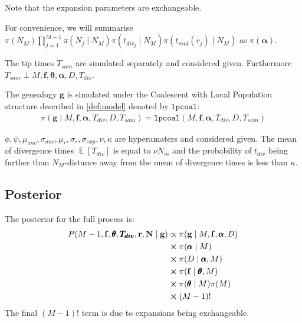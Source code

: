 \documentclass{report}
\theoremstyle{definition}
\begin{document}
Note that the expansion parameters are exchangeable.

For convenience, we will summarise $\pi(N_M)\prod\limits_{j=1}^{M-1}\pi(N_j\mid N_{M})\pi(t_{div_j}\mid N_{M})\pi(t_{mid}(r_j)\mid N_M)$ as $\pi(\pmb\alpha)$.

The tip times $T_{sam}$ are simulated separately and considered given. Furthermore $T_{sam} \perp M, \mathbf{f}, \pmb{\theta}, \pmb\alpha, D, T_{div}$.

The genealogy $\mathbf{g}$ is simulated under the Coalescent with Local Population structure described in \ref{def:model} denoted by $\texttt{lpcoal}$:
\begin{gather}
\pi(\mathbf{g}\mid M, \mathbf{f}, \pmb\alpha, T_{div}, D, T_{sam}) = \texttt{lpcoal}(M, \mathbf{f}, \pmb\alpha, T_{div}, D, T_{sam})
\end{gather} 

$\phi, \psi, \mu_{anc}, \sigma_{anc}, \mu_r, \sigma_r, \sigma_{exp}, \nu, \kappa$ are hyperamaters and considered given. The mean of divergence times $\mathop{\mathbb{E}}[T_{div}]$ is equal to $\nu N_m$ and the probability of $t_{div}$ being further than $N_M$-distance away from the mean of divergence times is less than $\kappa$.


\subsection{Posterior}
The posterior for the full process is:
\begin{gather}
\begin{aligned}
P(M-1, \mathbf{f}, \pmb{\theta}, \pmb{T_{div}}, \mathbf{r}, \mathbf{N}\mid\mathbf{g})
&\propto \pi(\mathbf{g}\mid M, \mathbf{f}, \pmb\alpha, D)\\
&\cross \pi(\pmb\alpha\mid M)\\
&\cross \pi(D\mid \pmb\alpha,M)\\
&\cross \pi(\mathbf{f}\mid\pmb{\theta}, M)\\
&\cross\pi(\pmb{\theta}\mid M)\pi(M)\\
&\cross (M-1)!
\end{aligned}
\end{gather}
The final $(M-1)!$ term is due to expansions being exchangeable.
\end{document}
